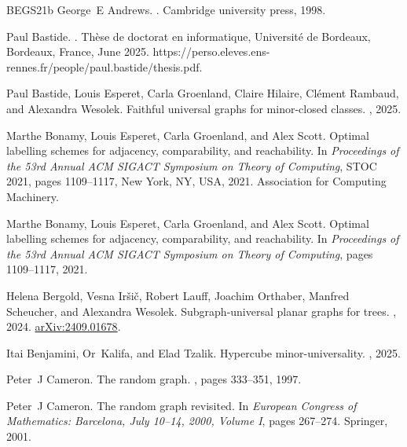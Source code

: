 \documentclass[11pt]{article}
\newcommand{\1}{\mathbbm{1}}
\begin{document}
\begin{thebibliography}{BEGS21b}
George~E Andrews.
.
\newblock Cambridge university press, 1998.

Paul Bastide.
.
\newblock Thèse de doctorat en informatique, Université de Bordeaux, Bordeaux, France, June 2025.
\newblock https://perso.eleves.ens-rennes.fr/people/paul.bastide/thesis.pdf.

Paul Bastide, Louis Esperet, Carla Groenland, Claire Hilaire, Cl{\'e}ment Rambaud, and Alexandra Wesolek.
\newblock Faithful universal graphs for minor-closed classes.
, 2025.

Marthe Bonamy, Louis Esperet, Carla Groenland, and Alex Scott.
\newblock Optimal labelling schemes for adjacency, comparability, and reachability.
\newblock In {\em Proceedings of the 53rd Annual ACM SIGACT Symposium on Theory of Computing}, STOC 2021, pages 1109--1117, New York, NY, USA, 2021. Association for Computing Machinery.

Marthe Bonamy, Louis Esperet, Carla Groenland, and Alex Scott.
\newblock Optimal labelling schemes for adjacency, comparability, and reachability.
\newblock In {\em Proceedings of the 53rd Annual ACM SIGACT Symposium on Theory of Computing}, pages 1109--1117, 2021.

Helena Bergold, Vesna Ir\v{s}i\v{c}, Robert Lauff, Joachim Orthaber, Manfred Scheucher, and Alexandra Wesolek.
\newblock Subgraph-universal planar graphs for trees.
, 2024.
\newblock \href{https://arxiv.org/abs/2409.01678}{arXiv:2409.01678}.

Itai Benjamini, Or~Kalifa, and Elad Tzalik.
\newblock Hypercube minor-universality.
, 2025.

Peter~J Cameron.
\newblock The random graph.
, pages 333--351, 1997.

Peter~J Cameron.
\newblock The random graph revisited.
\newblock In {\em European Congress of Mathematics: Barcelona, July 10--14, 2000, Volume I}, pages 267--274. Springer, 2001.


\end{thebibliography}
\end{document}

